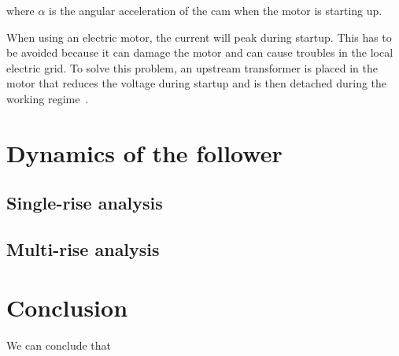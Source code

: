 \documentclass[a4paper]{article}
\begin{document}
where \(\alpha\) is the angular acceleration of the cam when the motor is starting up. 

When using an electric motor, the current will peak during startup. This has to be avoided because it can damage the motor and can cause troubles in the local electric grid. To solve this problem, an upstream transformer is placed in the motor that reduces the voltage during startup and is then detached during the working regime~\cite{energie}.



\section{Dynamics of the follower}

\subsection{Single-rise analysis}

\subsection{Multi-rise analysis}

\section*{Conclusion}

We can conclude that



\end{document}
